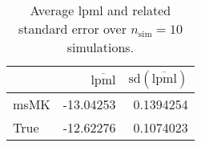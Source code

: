 \begin{table}[H]

\caption{Average lpml and related standard error over $n_{\text{sim}} = 10$ simulations.}
\centering
\begin{tabular}[t]{lrr}
\toprule
  & $\overbar{\text{lpml}}$ & $\text{sd}(\overbar{\text{lpml}})$\\
\midrule
msMK & -13.04253 & 0.1394254\\
True & -12.62276 & 0.1074023\\
\bottomrule
\end{tabular}
\end{table}